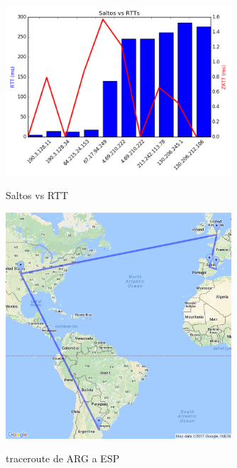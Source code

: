 \pagebreak


\begin{figure}[!h]
\centering
\caption{Saltos vs RTT}
\includegraphics[width=0.75\textwidth]{modules/grafico-rtt-EU}
 \label{fig:grafico-rtt-EU}
\end{figure}

\pagebreak

\begin{figure}[!h]
\centering
\caption{traceroute de ARG a ESP}
\includegraphics[width=0.75\textwidth]{modules/traceroute-EU}
 \label{fig:traceroute-EU}
\end{figure}
